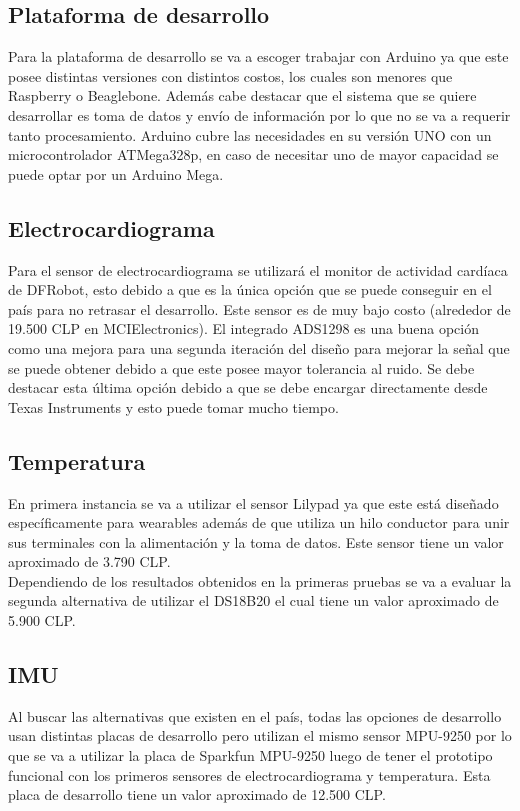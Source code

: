 \subsection{Plataforma de desarrollo}
Para la plataforma de desarrollo se va a escoger trabajar con Arduino ya que este posee distintas versiones con distintos costos, los cuales son menores que Raspberry o Beaglebone. Además cabe destacar que el sistema que se quiere desarrollar es toma de datos y envío de información por lo que no se va a requerir tanto procesamiento. Arduino cubre las necesidades en su versión UNO con un microcontrolador ATMega328p, en caso de necesitar uno de mayor capacidad se puede optar por un Arduino Mega.
\subsection{Electrocardiograma}
Para el sensor de electrocardiograma se utilizará el monitor de actividad cardíaca de DFRobot, esto debido a que es la única opción que se puede conseguir en el país para no retrasar el desarrollo. Este sensor es de muy bajo costo (alrededor de 19.500 CLP en MCIElectronics).
El integrado ADS1298 es una buena opción como una mejora para una segunda iteración del diseño para mejorar la señal que se puede obtener debido a que este posee mayor tolerancia al ruido. Se debe destacar esta última opción debido a que se debe encargar directamente desde Texas Instruments y esto puede tomar mucho tiempo.

\newpage
\subsection{Temperatura}
En primera instancia se va a utilizar el sensor Lilypad ya que este está diseñado específicamente para wearables además de que utiliza un hilo conductor para unir sus terminales con la alimentación y la toma de datos. Este sensor tiene un valor aproximado de 3.790 CLP.\\
Dependiendo de los resultados obtenidos en la primeras pruebas se va a evaluar la segunda alternativa de utilizar el DS18B20 el cual tiene un valor aproximado de 5.900 CLP.
\subsection{IMU}
Al buscar las alternativas que existen en el país, todas las opciones de desarrollo usan distintas placas de desarrollo pero utilizan el mismo sensor MPU-9250 por lo que se va a utilizar la placa de Sparkfun MPU-9250 luego de tener el prototipo funcional con los primeros sensores de electrocardiograma y temperatura. Esta placa de desarrollo tiene un valor aproximado de 12.500 CLP.

